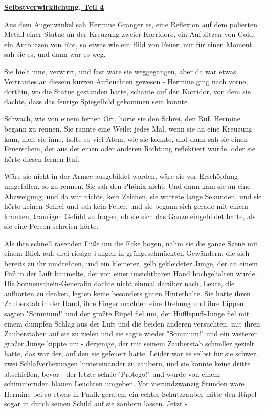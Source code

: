 

\hypertarget{selbstverwirklichung-teil-4}{%

\textbf{\uline{Selbstverwirklichung, Teil 4}}

Aus dem Augenwinkel sah Hermine Granger es, eine Reflexion auf dem polierten Metall einer Statue an der Kreuzung zweier Korridore, ein Aufblitzen von Gold, ein Aufblitzen von Rot, so etwas wie ein Bild von Feuer; nur für einen Moment sah sie es, und dann war es weg.

Sie hielt inne, verwirrt, und fast wäre sie weggegangen, aber da war etwas Vertrautes an diesem kurzen Aufleuchten gewesen - Hermine ging nach vorne, dorthin, wo die Statue gestanden hatte, schaute auf den Korridor, von dem sie dachte, dass das feurige Spiegelbild gekommen sein könnte.

Schwach, wie von einem fernen Ort, hörte sie den Schrei, den Ruf. Hermine begann zu rennen. Sie rannte eine Weile; jedes Mal, wenn sie an eine Kreuzung kam, hielt sie inne, holte so viel Atem, wie sie konnte, und dann sah sie einen Feuerschein, der aus der einen oder anderen Richtung reflektiert wurde, oder sie hörte diesen fernen Ruf.

Wäre sie nicht in der Armee ausgebildet worden, wäre sie vor Erschöpfung umgefallen, so zu rennen. Sie sah den Phönix nicht. Und dann kam sie an eine Abzweigung, und da war nichts, kein Zeichen, sie wartete lange Sekunden, und sie hörte keinen Schrei und sah kein Feuer, und sie begann sich gerade mit einem kranken, traurigen Gefühl zu fragen, ob sie sich das Ganze eingebildet hatte, als sie eine Person schreien hörte.

Als ihre schnell rasenden Füße um die Ecke bogen, nahm sie die ganze Szene mit einem Blick auf: drei riesige Jungen in grüngeschmückten Gewändern, die sich bereits zu ihr umdrehten, und ein kleinerer, gelb gekleideter Junge, der an einem Fuß in der Luft baumelte, der von einer unsichtbaren Hand hochgehalten wurde. Die Sonnenschein-Generalin dachte nicht einmal darüber nach, Leute, die aufhörten zu denken, legten keine besonders guten Hinterhalte. Sie hatte ihren Zauberstab in der Hand, ihre Finger machten eine Drehung und ihre Lippen sagten "Somnium!" und der größte Rüpel fiel um, der Hufflepuff-Junge fiel mit einem dumpfen Schlag aus der Luft und die beiden anderen versuchten, mit ihren Zauberstäben auf sie zu zielen und sie sagte wieder "Somnium!" und ein weiterer großer Junge kippte um - derjenige, der mit seinem Zauberstab schneller gezielt hatte, das war der, auf den sie gefeuert hatte. Leider war es selbst für sie schwer, zwei Schlafverhexungen hintereinander zu zaubern, und sie konnte keine dritte abschießen, bevor - der letzte schrie "Protego!" und wurde von einem schimmernden blauen Leuchten umgeben. Vor vierundzwanzig Stunden wäre Hermine bei so etwas in Panik geraten, ein echter Schutzzauber hätte den Rüpel sogar in durch seinen Schild auf sie zaubern lassen. Jetzt -

}
